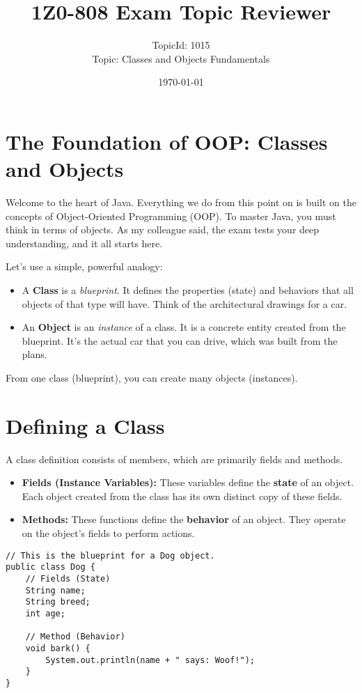 \documentclass[12pt]{article}
\title{\textbf{1Z0-808 Exam Topic Reviewer}}
\author{TopicId: 1015 \\ Topic: Classes and Objects Fundamentals}
\date{\today}
\begin{document}
\maketitle
\newpage\begin{enumerate}[label=(\arabic*)]
\section*{The Foundation of OOP: Classes and Objects}
Welcome to the heart of Java. Everything we do from this point on is built on the concepts of Object-Oriented Programming (OOP). To master Java, you must think in terms of objects. As my colleague said, the exam tests your deep understanding, and it all starts here.

Let's use a simple, powerful analogy:
\begin{itemize}
    \item A \textbf{Class} is a \textit{blueprint}. It defines the properties (state) and behaviors that all objects of that type will have. Think of the architectural drawings for a car.
    \item An \textbf{Object} is an \textit{instance} of a class. It is a concrete entity created from the blueprint. It's the actual car that you can drive, which was built from the plans.
\end{itemize}
From one class (blueprint), you can create many objects (instances).

\section{Defining a Class}
A class definition consists of members, which are primarily fields and methods.
\begin{itemize}
    \item \textbf{Fields (Instance Variables):} These variables define the \textbf{state} of an object. Each object created from the class has its own distinct copy of these fields. 
    \item \textbf{Methods:} These functions define the \textbf{behavior} of an object. They operate on the object's fields to perform actions.
\end{itemize}

\begin{verbatim}
// This is the blueprint for a Dog object.
public class Dog {
    // Fields (State)
    String name;
    String breed;
    int age;

    // Method (Behavior)
    void bark() {
        System.out.println(name + " says: Woof!");
    }
}
\end{verbatim}


\end{enumerate}
\end{document}
